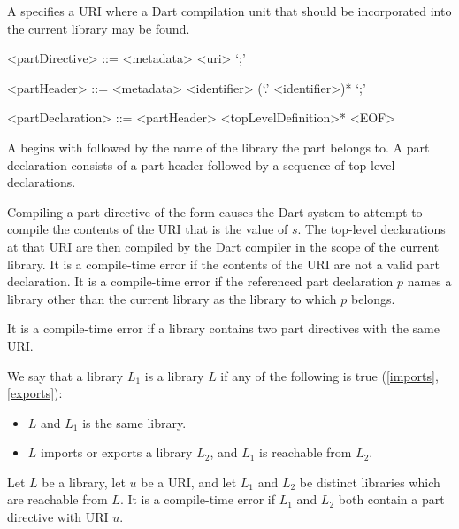 \documentclass[makeidx]{article}
\begin{document}
{\LMHash{}%
A  specifies a URI where a Dart compilation unit that should be incorporated into the current library may be found.

\begin{grammar}
<partDirective> ::= <metadata> \PART{} <uri> `;'

<partHeader> ::= <metadata> \PART{} \OF{} <identifier> (`.' <identifier>)* `;'

<partDeclaration> ::= <partHeader> <topLevelDefinition>* <EOF>
\end{grammar}

\LMHash{}%
A  begins with \PART{} \OF{} followed by the name of the library the part belongs to.
A part declaration consists of a part header followed by a sequence of top-level declarations.

\LMHash{}%
Compiling a part directive of the form  causes the Dart system to attempt to compile the contents of the URI that is the value of $s$.
The top-level declarations at that URI are then compiled by the Dart compiler in the scope of the current library.
It is a compile-time error if the contents of the URI are not a valid part declaration.
It is a compile-time error if the referenced part declaration $p$ names a library other than the current library as the library to which $p$ belongs.

\LMHash{}%
It is a compile-time error if a library contains
two part directives with the same URI.

\LMHash{}%
We say that a library $L_1$ is  a library $L$ if
any of the following is true (\ref{imports}, \ref{exports}):
\begin{itemize}
\item $L$ and $L_1$ is the same library.
\item $L$ imports or exports a library $L_2$, and $L_1$ is reachable from $L_2$.
\end{itemize}

\LMHash{}%
Let $L$ be a library, let $u$ be a URI,
and let $L_1$ and $L_2$ be distinct libraries which are reachable from $L$.
It is a compile-time error if $L_1$ and $L_2$ both contain
a part directive with URI $u$.



}
\end{document}
